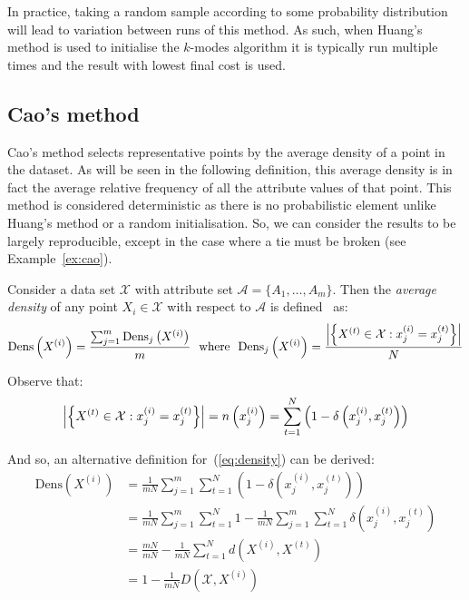 In practice, taking a random sample according to some probability distribution
will lead to variation between runs of this method. As such, when Huang's method
is used to initialise the \(k\)-modes algorithm it is typically run multiple
times and the result with lowest final cost is used.

%

\subsection{Cao's method}\label{subsec:cao}

Cao's method selects representative points by the average density of a point in
the dataset. As will be seen in the following definition, this average density 
is in fact the average relative frequency of all the attribute values of that 
point. This method is considered deterministic as there is no probabilistic
element \- unlike Huang's method or a random initialisation. So, we can consider
the results to be largely reproducible, except in the case where a tie must be
broken (see Example~\ref{ex:cao}).

\begin{definition}\label{def:density}	
    Consider a data set \(\mathcal{X}\) with attribute set \(\mathcal{A} = 
    \{A_1, \ldots, A_m\}\). Then the \emph{average density} of any point 
    \(X_i \in \mathcal{X}\) with respect to \(\mathcal{A}\) is 
    defined~\cite{Cao2009} as:
    \begin{equation}\label{eq:density}
        \text{Dens}\left(X^{(i)}\right) = \frac{%
            \sum_{j=1}^m \text{Dens}_{j}\left(X^{(i)}\right)
        }{m}
        \ \ \text{where} \ \
        \text{Dens}_{j}\left(X^{(i)}\right) = \frac{%
            \abs*{%
                \left\{X^{(t)} \in \mathcal{X} : x_j^{(i)} = x_j^{(t)}\right\}
            }
        }{N}
    \end{equation}

    Observe that:
    \[
        \abs*{\left\{X^{(t)} \in \mathcal{X} : x_j^{(i)} = x_j^{(t)}\right\}}%
        = n\left(x_j^{(i)}\right)%
        = \sum_{t=1}^N \left(1 - \delta\left(x_j^{(i)}, x_j^{(t)}\right)\right)
    \]

    And so, an alternative definition for~(\ref{eq:density}) can be derived:
    \begin{equation}\label{eq:density-alt}
    \begin{aligned}
        \text{Dens}\left(X^{(i)}\right)
        & = \frac{1}{mN} \sum_{j=1}^m \sum_{t=1}^N \left(%
            1 - \delta\left(x_j^{(i)}, x_j^{(t)}\right)
        \right)\\
        & = \frac{1}{mN} \sum_{j=1}^m \sum_{t=1}^N 1%
            - \frac{1}{mN} \sum_{j=1}^m \sum_{t=1}^N
            \delta\left(x_j^{(i)}, x_j^{(t)}\right)\\
        & = \frac{mN}{mN} - \frac{1}{mN} \sum_{t=1}^N
            d\left(X^{(i)}, X^{(t)}\right)\\
        & = 1 - \frac{1}{mN} D\left(\mathcal{X}, X^{(i)}\right)
    \end{aligned}
    \end{equation}
\end{definition}

